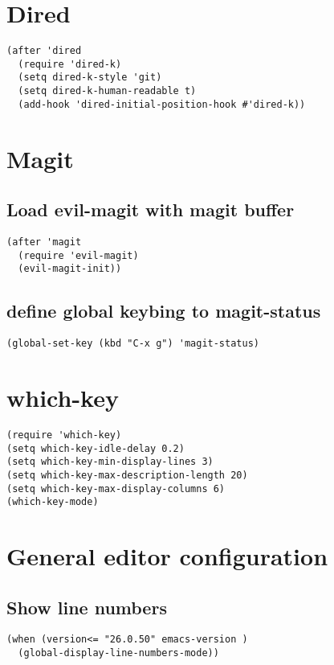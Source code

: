 \documentclass[11pt]{article}
\begin{document}
\section*{Dired}
\label{sec:org5ba160c}

\begin{verbatim}
(after 'dired
  (require 'dired-k)
  (setq dired-k-style 'git)
  (setq dired-k-human-readable t)
  (add-hook 'dired-initial-position-hook #'dired-k))
\end{verbatim}


\section*{Magit}
\label{sec:org04a2d6c}

\subsection*{Load evil-magit with magit buffer}
\label{sec:org7e2f276}

\begin{verbatim}
(after 'magit
  (require 'evil-magit)
  (evil-magit-init))
\end{verbatim}


\subsection*{define global keybing to magit-status}
\label{sec:orge20856e}

\begin{verbatim}
(global-set-key (kbd "C-x g") 'magit-status)
\end{verbatim}


\section*{which-key}
\label{sec:org6a1a572}

\begin{verbatim}
(require 'which-key)
(setq which-key-idle-delay 0.2)
(setq which-key-min-display-lines 3)
(setq which-key-max-description-length 20)
(setq which-key-max-display-columns 6)
(which-key-mode)
\end{verbatim}


\section*{General editor configuration}
\label{sec:org549a0da}


\subsection*{Show line numbers}
\label{sec:org7b7843d}
\begin{verbatim}
(when (version<= "26.0.50" emacs-version )
  (global-display-line-numbers-mode))
\end{verbatim}
\end{document}
